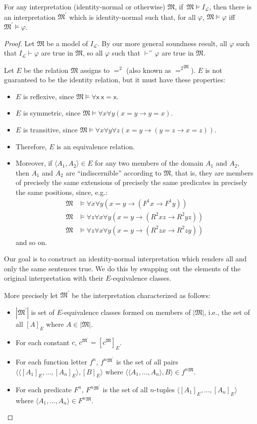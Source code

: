 \documentclass[12pt]{report}
\theoremstyle{nonumberplain}
\newtheorem{proof}{Proof}
\newcommand{\M}{\mathfrak{M}}
\renewcommand{\o}[1]{\mathsf{#1}}
\begin{document}
\begin{mt}
For any interpretation (identity-normal or otherwise) $\M$, if \,$\M ⊨ I_\mathcal{L}$, then there is an interpretation $\M^{\prime}$ which is identity-normal such that, for all $φ$, $\M ⊨ φ$ iff \,$\M^{\prime} ⊨ φ$.
\end{mt}
\begin{proof}
Let $\M$ be a model of $I_\mathcal{L}$. By our more general soundness result, all $φ$ such that $I_\mathcal{L} ⊢ φ$ are true in $\M$, so all $φ$ such that $⊢^{=} φ$ are true in $\M$.

Let $E$ be the relation $\M$ assigns to $=^2$ (also known as $\mathord{=^2}^\M$). $E$ is not guaranteed to be the identity relation, but it must have these properties:
\begin{itemize}[nolistsep,leftmargin=*]
\item $E$ is reflexive, since $\M ⊨ ∀\o{x}\ \o{x}=\o{x}$.
\item $E$ is symmetric, since $\M ⊨ ∀x∀y(x=y → y=x)$.
\item $E$ is transitive, since $\M ⊨ ∀x∀y∀z(x=y → (y=z → x=z))$.
\item Therefore, $E$ is an equivalence relation.
\item Moreover, if $⟨A_1, A_2⟩∈E$ for any two members of the domain $A_1$ and $A_2$, then $A_1$ and $A_2$ are ``indiscernible'' according to $\M$, that is, they are members of precisely the same extensions of precisely the same predicates in precisely the same positions, since, e.g.: \begin{align*}\M &⊨ ∀x∀y(x = y → (F^1x → F^1y)) \\ \M &⊨ ∀z∀x∀y(x = y → (R^2xz → R^2yz)) \\ \M &⊨ ∀z∀x∀y(x = y → (R^2zx → R^2zy))\end{align*} and so on.
\end{itemize}
\medskip
Our goal is to construct an identity-normal interpretation which renders all and only the same sentences true. We do this by swapping out the elements of the original interpretation with their $E$-equivalence classes.

More precisely let $\M^{\prime}$ be the interpretation characterized as follows:
\begin{itemize}[nolistsep,leftmargin=*]
\item $|\M^{\prime}|$ is set of $E$-equivalence classes formed on members of $|\M|$, i.e., the set of all $[A]_E$ where $A∈|\M|$.
\item For each constant $c$, $c^{\M^\prime} = [c^{\M}]_E$.
\item For each function letter $f^n$, $f^n{}^{\M^\prime}$ is the set of all pairs $⟨⟨[A_1]_E, \dotsc, [A_n]_E⟩, [B]_E⟩$ where $⟨⟨A_1, \dotsc, A_n⟩, B⟩ ∈ f^n{}^{\M}$.
\item For each predicate $F^n$, $F^n{}^{\M^\prime}$ is the set of all $n$-tuples $⟨[A_1]_E, \dotsc, [A_n]_E⟩$ where $⟨A_1, \dotsc, A_n⟩ ∈ F^n{}^{\M}$.
\end{itemize}


\end{proof}
\end{document}
